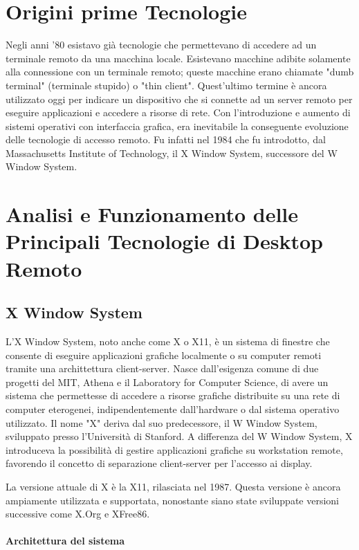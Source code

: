 \documentclass[12pt,a4paper,openright,twoside]{book}
\begin{document}
\section{Origini prime Tecnologie}
Negli anni '80 esistavo già tecnologie che permettevano di accedere ad un terminale remoto da una macchina locale. Esistevano macchine adibite solamente alla connessione con un terminale remoto; queste macchine erano chiamate "dumb terminal" (terminale stupido) o "thin client". Quest'ultimo termine è ancora utilizzato oggi per indicare un dispositivo che si connette ad un server remoto per eseguire applicazioni e accedere a risorse di rete.
Con l'introduzione e aumento di sistemi operativi con interfaccia grafica, era inevitabile la conseguente evoluzione delle tecnologie di accesso remoto. Fu infatti nel 1984 che fu introdotto, dal Massachusetts Institute of Technology, il X Window System, successore del W Window System.

\section{Analisi e Funzionamento delle Principali Tecnologie di Desktop Remoto} 

\subsection{X Window System}
L'X Window System, noto anche come X o X11, è un sistema di finestre che consente di eseguire applicazioni grafiche localmente o su computer remoti tramite una archittettura client-server.
Nasce dall'esigenza comune di due progetti del MIT, Athena e il Laboratory for Computer Science, di avere un sistema che permettesse di accedere a risorse grafiche distribuite su una rete di computer eterogenei, indipendentemente dall'hardware o dal sistema operativo utilizzato.
Il nome "X" deriva dal suo predecessore, il W Window System, sviluppato presso l'Università di Stanford. A differenza del W Window System, X introduceva la possibilità di gestire applicazioni grafiche su workstation remote, favorendo il concetto di separazione client-server per l'accesso ai display.

La versione attuale di X è la X11, rilasciata nel 1987. Questa versione è ancora ampiamente utilizzata e supportata, nonostante siano state sviluppate versioni successive come X.Org e XFree86.

\paragraph{Architettura del sistema}
\end{document}
